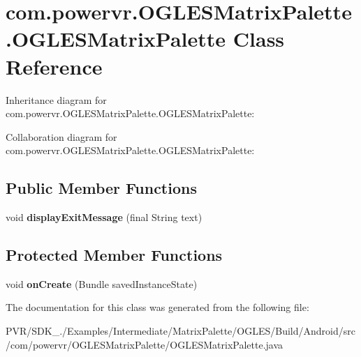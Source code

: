 \hypertarget{classcom_1_1powervr_1_1_o_g_l_e_s_matrix_palette_1_1_o_g_l_e_s_matrix_palette}{\section{com.\+powervr.\+O\+G\+L\+E\+S\+Matrix\+Palette.\+O\+G\+L\+E\+S\+Matrix\+Palette Class Reference}
\label{classcom_1_1powervr_1_1_o_g_l_e_s_matrix_palette_1_1_o_g_l_e_s_matrix_palette}
}


Inheritance diagram for com.\+powervr.\+O\+G\+L\+E\+S\+Matrix\+Palette.\+O\+G\+L\+E\+S\+Matrix\+Palette\+:


Collaboration diagram for com.\+powervr.\+O\+G\+L\+E\+S\+Matrix\+Palette.\+O\+G\+L\+E\+S\+Matrix\+Palette\+:
\subsection*{Public Member Functions}
\begin{DoxyCompactItemize}
\item 
\hypertarget{classcom_1_1powervr_1_1_o_g_l_e_s_matrix_palette_1_1_o_g_l_e_s_matrix_palette_a25f2b3bbfc69d292136180995adbdf06}{void {\bfseries display\+Exit\+Message} (final String text)}\label{classcom_1_1powervr_1_1_o_g_l_e_s_matrix_palette_1_1_o_g_l_e_s_matrix_palette_a25f2b3bbfc69d292136180995adbdf06}

\end{DoxyCompactItemize}
\subsection*{Protected Member Functions}
\begin{DoxyCompactItemize}
\item 
\hypertarget{classcom_1_1powervr_1_1_o_g_l_e_s_matrix_palette_1_1_o_g_l_e_s_matrix_palette_aa2ab93db87e46315260435bbe7b723b6}{void {\bfseries on\+Create} (Bundle saved\+Instance\+State)}\label{classcom_1_1powervr_1_1_o_g_l_e_s_matrix_palette_1_1_o_g_l_e_s_matrix_palette_aa2ab93db87e46315260435bbe7b723b6}

\end{DoxyCompactItemize}


The documentation for this class was generated from the following file\+:\begin{DoxyCompactItemize}
\item 
P\+V\+R/\+S\+D\+K\+\_./\+Examples/\+Intermediate/\+Matrix\+Palette/\+O\+G\+L\+E\+S/\+Build/\+Android/src/com/powervr/\+O\+G\+L\+E\+S\+Matrix\+Palette/O\+G\+L\+E\+S\+Matrix\+Palette.\+java\end{DoxyCompactItemize}
